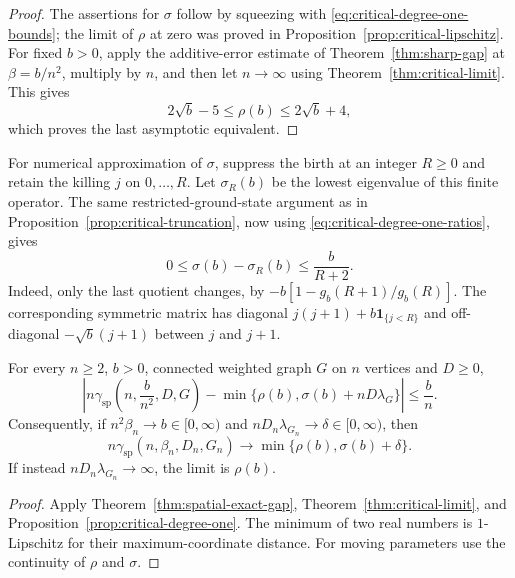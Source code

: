 \begin{proof}
The assertions for $\sigma$ follow by squeezing with
\eqref{eq:critical-degree-one-bounds}; the limit of $\rho$ at zero
was proved in Proposition~\ref{prop:critical-lipschitz}.
For fixed $b>0$, apply the additive-error estimate of
Theorem~\ref{thm:sharp-gap} at $\beta=b/n^2$, multiply by $n$, and
then let $n\to\infty$ using Theorem~\ref{thm:critical-limit}.
This gives
\[
 2\sqrt b-5\leq\rho(b)\leq2\sqrt b+4,
\]
which proves the last asymptotic equivalent.
\end{proof}

For numerical approximation of $\sigma$, suppress the birth at an
integer $R\ge0$ and retain the killing $j$ on $0,\ldots,R$.
Let $\sigma_R(b)$ be the lowest eigenvalue of this finite operator.
The same restricted-ground-state argument as in
Proposition~\ref{prop:critical-truncation}, now using
\eqref{eq:critical-degree-one-ratios}, gives
\begin{equation}\label{eq:critical-sigma-truncation}
 0\le\sigma(b)-\sigma_R(b)\le\frac{b}{R+2}.
\end{equation}
Indeed, only the last quotient changes, by
$-b[1-g_b(R+1)/g_b(R)]$. The corresponding symmetric matrix has
diagonal $j(j+1)+b\mathbf1_{\{j<R\}}$ and off-diagonal
$-\sqrt b(j+1)$ between $j$ and $j+1$.

\begin{corollary}
\label{cor:critical-spatial-limit}
For every $n\geq2$, $b>0$, connected weighted graph $G$ on $n$
vertices and $D\geq0$,
\begin{equation}\label{eq:critical-spatial-error}
 \left|n\gamma_{\mathrm{sp}}\left(n,\frac b{n^2},D,G\right)
 -\min\{\rho(b),\sigma(b)+nD\lambda_G\}\right|
 \leq\frac bn.
\end{equation}
Consequently, if $n^2\beta_n\to b\in[0,\infty)$ and
$nD_n\lambda_{G_n}\to\delta\in[0,\infty)$, then
\begin{equation}\label{eq:critical-spatial-limit}
 n\gamma_{\mathrm{sp}}(n,\beta_n,D_n,G_n)
 \longrightarrow\min\{\rho(b),\sigma(b)+\delta\}.
\end{equation}
If instead $nD_n\lambda_{G_n}\to\infty$, the limit is $\rho(b)$.
\end{corollary}

\begin{proof}
Apply Theorem~\ref{thm:spatial-exact-gap},
Theorem~\ref{thm:critical-limit}, and
Proposition~\ref{prop:critical-degree-one}.  The minimum of two
real numbers is $1$-Lipschitz for their maximum-coordinate distance.
For moving parameters use the continuity of $\rho$ and $\sigma$.
\end{proof}

